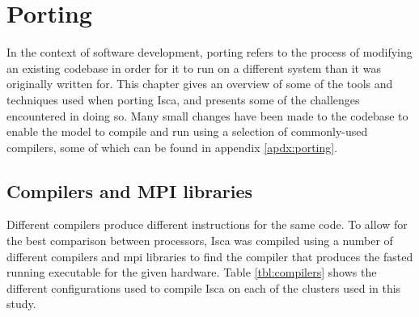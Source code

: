 \documentclass[a4paper,11pt]{report}
\begin{document}
\chapter{Porting}
\label{chap:baselineexp}
In the context of software development, porting refers to the process of modifying an existing codebase in order for it to run on a different system than it was originally written for. This chapter gives an overview of some of the tools and techniques used when porting Isca, and presents some of the challenges encountered in doing so. Many small changes have been made to the codebase to enable the model to compile and run using a selection of commonly-used compilers, some of which can be found in appendix \ref{apdx:porting}. 

\section{Compilers and MPI libraries}
Different compilers produce different instructions for the same code. To allow for the best comparison between processors, Isca was compiled using a number of different compilers and \gls{mpi} libraries to find the compiler that produces the fasted running executable for the given hardware. Table \ref{tbl:compilers} shows the different configurations used to compile Isca on each of the clusters used in this study. 
\end{document}
